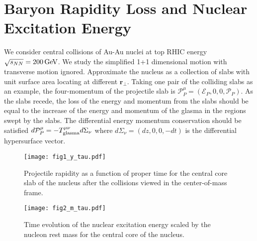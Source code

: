 \documentclass[a4paper]{jpconf}
\begin{document}
\section{Baryon Rapidity Loss and Nuclear Excitation Energy}
We consider central collisions of Au-Au nuclei at top RHIC energy $\sqrt{s_{NN}} = 200\, \rm{GeV}$.  We study the simplified 1+1 dimensional motion with transverse motion ignored.  Approximate the nucleus as a collection of slabs with unit surface area locating at different $\mathbf{r}_{\perp}$.  Taking one pair of the colliding slabs as an example, the four-momentum of the projectile slab is $\mathcal{P}_{P}^{\mu} = (\mathcal{E}_{P}, 0 ,0,\mathcal{P}_{P})$. As the slabs recede, the loss of the energy and momentum from the slabs should be equal to the increase of the energy and momentum of the glasma in the regions swept by the slabs. The differential energy momentum conservation should be satisfied $d\mathcal{P}_{P}^{\mu} = -T^{\mu\nu}_{\rm{glasma}} d\Sigma_{\nu}$ where $d\Sigma_{\nu} =(dz, 0 ,0 ,-dt)$ is the differential hypersurface vector.

\begin{figure}[h]
\begin{minipage}{0.5\textwidth}
\centering
\texttt{[image: fig1\_y\_tau.pdf]}
\caption{\small Projectile rapidity as a function of proper time for the central core slab of the nucleus after the collisions viewed in the center-of-mass frame. }
\label{fig1_y_tau}
\end{minipage}
\hspace{0.1in}
\begin{minipage}{0.5\textwidth}
\centering
\texttt{[image: fig2\_m\_tau.pdf]}
\caption{\small Time evolution of the nuclear excitation energy scaled by the nucleon rest mass for the central core of the nucleus.}
\label{fig2_m_tau}
\end{minipage}
\end{figure}
\end{document}
